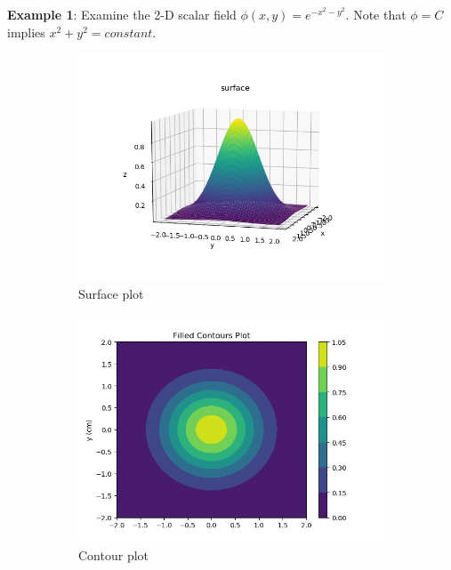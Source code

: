 \documentclass[10pt,a4paper]{article}
\begin{document}
\pagebreak

\textbf{Example 1}: Examine the 2-D scalar field $\phi(x,y)=e^{-x^2-y^2}$. Note that $\phi=C$
implies $x^2+y^2 = constant$. 
\begin{figure} [h]
    \centering
    \begin{subfigure}{.5\textwidth}
      \centering
      \includegraphics[scale=0.35]{exp_scalar.JPEG}
      \caption{Surface plot}
      \label{fig:sub1}
    \end{subfigure}%
    \begin{subfigure}{.5\textwidth}
      \centering
      \includegraphics[scale=0.35]{exp_contour.jpeg}
      \caption{Contour plot}
      \label{fig:sub2}
    \end{subfigure}
    \caption*{}
    \label{fig:test}
\end{figure}
\end{document}
